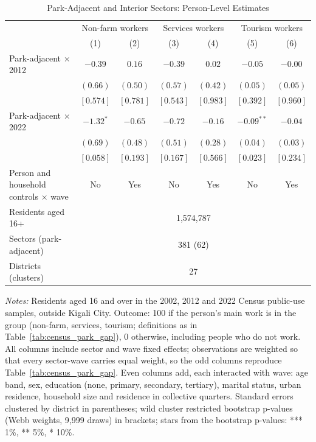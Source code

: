 \documentclass[11pt]{article}
\begin{document}
\begin{table}[H]
\centering
\caption{Park-Adjacent and Interior Sectors: Person-Level Estimates}
\label{tab:census_park_gap_person}
\begin{tabular}{lcccccc}
\toprule
 & \multicolumn{2}{c}{Non-farm workers} & \multicolumn{2}{c}{Services workers} & \multicolumn{2}{c}{Tourism workers} \\
 & (1) & (2) & (3) & (4) & (5) & (6) \\
\midrule
Park-adjacent $\times$ 2012 & $-0.39$ & $0.16$ & $-0.39$ & $0.02$ & $-0.05$ & $-0.00$ \\
 & $(0.66)$ & $(0.50)$ & $(0.57)$ & $(0.42)$ & $(0.05)$ & $(0.05)$ \\
 & $[0.574]$ & $[0.781]$ & $[0.543]$ & $[0.983]$ & $[0.392]$ & $[0.960]$ \\
Park-adjacent $\times$ 2022 & $-1.32^{*}$ & $-0.65$ & $-0.72$ & $-0.16$ & $-0.09^{**}$ & $-0.04$ \\
 & $(0.69)$ & $(0.48)$ & $(0.51)$ & $(0.28)$ & $(0.04)$ & $(0.03)$ \\
 & $[0.058]$ & $[0.193]$ & $[0.167]$ & $[0.566]$ & $[0.023]$ & $[0.234]$ \\
\midrule
Person and household controls $\times$ wave & No & Yes & No & Yes & No & Yes \\
Residents aged 16+ & \multicolumn{6}{c}{1,574,787} \\
Sectors (park-adjacent) & \multicolumn{6}{c}{381 (62)} \\
Districts (clusters) & \multicolumn{6}{c}{27} \\
\bottomrule
\end{tabular}
\begin{minipage}{0.95\textwidth}\footnotesize
\textit{Notes:} Residents aged 16 and over in the 2002, 2012 and 2022 Census public-use samples, outside Kigali City. Outcome: 100 if the person's main work is in the group (non-farm, services, tourism; definitions as in Table~\ref{tab:census_park_gap}), 0 otherwise, including people who do not work. All columns include sector and wave fixed effects; observations are weighted so that every sector-wave carries equal weight, so the odd columns reproduce Table~\ref{tab:census_park_gap}. Even columns add, each interacted with wave: age band, sex, education (none, primary, secondary, tertiary), marital status, urban residence, household size and residence in collective quarters. Standard errors clustered by district in parentheses; wild cluster restricted bootstrap p-values (Webb weights, 9,999 draws) in brackets; stars from the bootstrap p-values: *** 1\%, ** 5\%, * 10\%.
\end{minipage}
\end{table}
\end{document}

